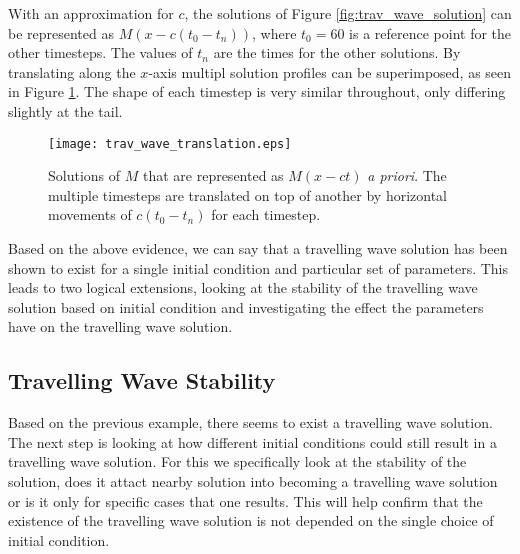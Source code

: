 With an approximation for $c$, the solutions of Figure \ref{fig:trav_wave_solution} can be represented as $M(x - c (t_0 - t_{n}))$, where $t_0 = 60$ is a reference point for the other timesteps.
The values of $t_{n}$ are the times for the other solutions.
By translating along the $x$-axis multipl solution profiles can be superimposed, as seen in Figure \ref{fig:trav_wave_translation}.
The shape of each timestep is very similar throughout, only differing slightly at the tail.

\begin{figure}[h!tb]
\begin{center}
    \texttt{[image: trav\_wave\_translation.eps]}
    \caption{Solutions of $M$ that are represented as $M(x -ct)$ \textit{a priori}.
      The multiple timesteps are translated on top of another by horizontal movements of $c (t_0 - t_n)$ for each timestep.
      }
    \label{fig:trav_wave_translation}
\end{center}
\end{figure}

Based on the above evidence, we can say that a travelling wave solution has been shown to exist for a single initial condition and particular set of parameters.
This leads to two logical extensions, looking at the stability of the travelling wave solution based on initial condition and investigating the effect the parameters have on the travelling wave solution.

\subsection{Travelling Wave Stability}


Based on the previous example, there seems to exist a travelling wave solution. %
The next step is looking at how different initial conditions could still result in a travelling wave solution.
For this we specifically look at the stability of the solution, does it attact nearby solution into becoming a travelling wave solution or is it only for specific cases that one results.
This will help confirm that the existence of the travelling wave solution is not depended on the single choice of initial condition.

